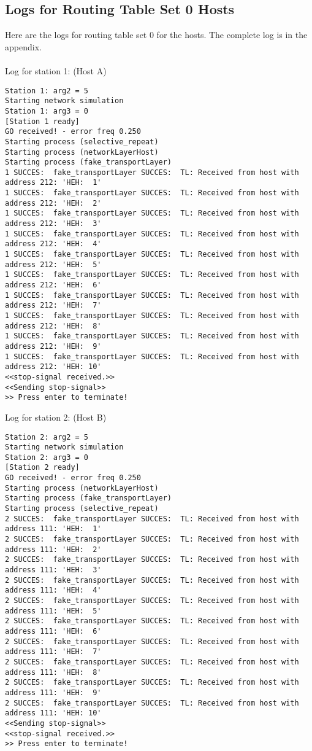 \subsection{Logs for Routing Table Set 0 Hosts}
Here are the logs for routing table set 0 for the hosts. The complete log is in the appendix.\\
\\
Log for station 1: (Host A)
\begin{lstlisting}[breaklines=true]
Station 1: arg2 = 5
Starting network simulation
Station 1: arg3 = 0
[Station 1 ready]
GO received! - error freq 0.250
Starting process (selective_repeat)
Starting process (networkLayerHost)
Starting process (fake_transportLayer)
1 SUCCES:  fake_transportLayer SUCCES:  TL: Received from host with address 212: 'HEH:  1'
1 SUCCES:  fake_transportLayer SUCCES:  TL: Received from host with address 212: 'HEH:  2'
1 SUCCES:  fake_transportLayer SUCCES:  TL: Received from host with address 212: 'HEH:  3'
1 SUCCES:  fake_transportLayer SUCCES:  TL: Received from host with address 212: 'HEH:  4'
1 SUCCES:  fake_transportLayer SUCCES:  TL: Received from host with address 212: 'HEH:  5'
1 SUCCES:  fake_transportLayer SUCCES:  TL: Received from host with address 212: 'HEH:  6'
1 SUCCES:  fake_transportLayer SUCCES:  TL: Received from host with address 212: 'HEH:  7'
1 SUCCES:  fake_transportLayer SUCCES:  TL: Received from host with address 212: 'HEH:  8'
1 SUCCES:  fake_transportLayer SUCCES:  TL: Received from host with address 212: 'HEH:  9'
1 SUCCES:  fake_transportLayer SUCCES:  TL: Received from host with address 212: 'HEH: 10'
<<stop-signal received.>>
<<Sending stop-signal>>
>> Press enter to terminate!
\end{lstlisting}

Log for station 2: (Host B)
\begin{lstlisting}[breaklines=true]
Station 2: arg2 = 5
Starting network simulation
Station 2: arg3 = 0
[Station 2 ready]
GO received! - error freq 0.250
Starting process (networkLayerHost)
Starting process (fake_transportLayer)
Starting process (selective_repeat)
2 SUCCES:  fake_transportLayer SUCCES:  TL: Received from host with address 111: 'HEH:  1'
2 SUCCES:  fake_transportLayer SUCCES:  TL: Received from host with address 111: 'HEH:  2'
2 SUCCES:  fake_transportLayer SUCCES:  TL: Received from host with address 111: 'HEH:  3'
2 SUCCES:  fake_transportLayer SUCCES:  TL: Received from host with address 111: 'HEH:  4'
2 SUCCES:  fake_transportLayer SUCCES:  TL: Received from host with address 111: 'HEH:  5'
2 SUCCES:  fake_transportLayer SUCCES:  TL: Received from host with address 111: 'HEH:  6'
2 SUCCES:  fake_transportLayer SUCCES:  TL: Received from host with address 111: 'HEH:  7'
2 SUCCES:  fake_transportLayer SUCCES:  TL: Received from host with address 111: 'HEH:  8'
2 SUCCES:  fake_transportLayer SUCCES:  TL: Received from host with address 111: 'HEH:  9'
2 SUCCES:  fake_transportLayer SUCCES:  TL: Received from host with address 111: 'HEH: 10'
<<Sending stop-signal>>
<<stop-signal received.>>
>> Press enter to terminate!
\end{lstlisting}
